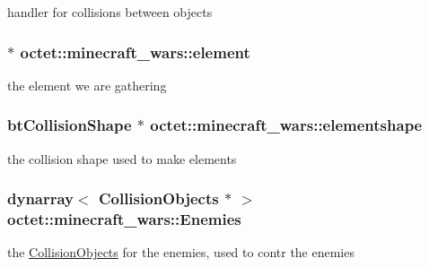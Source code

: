 handler for collisions between objects 

\hypertarget{classoctet_1_1minecraft__wars_a2737ea29048537da921679cd2c0d1885}{
\subsubsection[{element}]{ $\ast$ octet\+::minecraft\+\_\+wars\+::element\hspace{0.3cm}{\ttfamily [private]}}}\label{classoctet_1_1minecraft__wars_a2737ea29048537da921679cd2c0d1885}


the element we are gathering 

\hypertarget{classoctet_1_1minecraft__wars_a76be6b7555e4fed213a4846bde7d3ba0}{
\subsubsection[{elementshape}]{\setlength{\rightskip}{0pt plus 5cm}bt\+Collision\+Shape $\ast$ octet\+::minecraft\+\_\+wars\+::elementshape\hspace{0.3cm}{\ttfamily [private]}}}\label{classoctet_1_1minecraft__wars_a76be6b7555e4fed213a4846bde7d3ba0}


the collision shape used to make elements 

\hypertarget{classoctet_1_1minecraft__wars_af16a3ace67e10fe889a385b8ab8405cb}{
\subsubsection[{Enemies}]{\setlength{\rightskip}{0pt plus 5cm}dynarray$<$ {\bf Collision\+Objects} $\ast$ $>$ octet\+::minecraft\+\_\+wars\+::\+Enemies\hspace{0.3cm}{\ttfamily [private]}}}\label{classoctet_1_1minecraft__wars_af16a3ace67e10fe889a385b8ab8405cb}


the \hyperlink{classoctet_1_1_collision_objects}{Collision\+Objects} for the enemies, used to contr the enemies 

